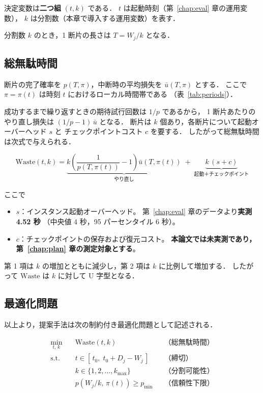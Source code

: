 \documentclass[11pt,a4paper]{ltjsreport}
\newcommand{\Waste}{\mathrm{Waste}}
\begin{document}
決定変数は\textbf{二つ組} $(t, k)$ である．
$t$ は起動時刻（第~\ref{chap:eval} 章の運用変数），
$k$ は分割数（本章で導入する運用変数）を表す．

分割数 $k$ のとき，1 断片の長さは $T = W_j / k$ となる．

\subsection{総無駄時間}

断片の完了確率を $p(T, \pi)$，中断時の平均損失を $\bar u(T, \pi)$ とする．
ここで $\pi = \pi(t)$ は時刻 $t$ におけるローカル時間帯である
（表~\ref{tab:periods}）．

成功するまで繰り返すときの期待試行回数は $1/p$ であるから，
1 断片あたりのやり直し損失は $(1/p - 1)\,\bar u$ となる．
断片は $k$ 個あり，各断片について起動オーバーヘッド $s$ と
チェックポイントコスト $c$ を要する．
したがって総無駄時間は次式で与えられる．

\begin{equation}
\boxed{\;
\Waste(t,k)
=
\underbrace{k \left( \frac{1}{p(T,\pi(t))} - 1 \right) \bar u(T,\pi(t))}_{\text{やり直し}}
\;+\;
\underbrace{k\,(s + c)}_{\text{起動＋チェックポイント}}
\;}
\label{eq:waste}
\end{equation}

ここで

\begin{itemize}
  \item $s$：インスタンス起動オーバーヘッド。
        第~\ref{chap:eval} 章のデータより\textbf{実測 4.52 秒}
        （中央値 4 秒，95 パーセンタイル 6 秒）。
  \item $c$：チェックポイントの保存および復元コスト。
        \textbf{本論文では未実測であり，第~\ref{chap:plan} 章の測定対象とする}。
\end{itemize}

第 1 項は $k$ の増加とともに減少し，第 2 項は $k$ に比例して増加する．
したがって $\Waste$ は $k$ に対して U 字型となる．

\subsection{最適化問題}

以上より，提案手法は次の制約付き最適化問題として記述される．

\begin{equation}
\begin{aligned}
\min_{t,\,k}\quad
  & \Waste(t,k) && \text{（総無駄時間）} \\[3pt]
\text{s.t.}\quad
  & t \in [\,t_0,\; t_0 + D_j - W_j\,] && \text{（締切）} \\[2pt]
  & k \in \{1, 2, \ldots, k_{\max}\}   && \text{（分割可能性）} \\[2pt]
  & p(W_j/k,\, \pi(t)) \geq p_{\min}   && \text{（信頼性下限）}
\end{aligned}
\label{eq:opt}
\end{equation}
\end{document}
